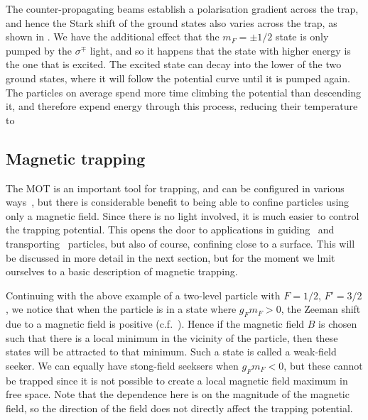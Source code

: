 The counter-propagating beams establish a polarisation gradient across the
trap, and hence the Stark shift of the ground states also varies across the
trap, as shown in \myfigref{}. We have the additional effect that the
$m_F=\pm1/2$ state is only pumped by the $\sigma^\mp$ light, and so it happens
that the state with higher energy is the one that is excited. The excited state
can decay into the lower of the two ground states, where it will follow the
potential curve until it is pumped again. The particles on average spend more
time climbing the potential than descending it, and therefore expend energy
through this process, reducing their temperature to 



\subsection{Magnetic trapping}

The MOT is an important tool for trapping, and can be configured in various
ways~\cite{}, but there is considerable benefit to being able to confine
particles using only a magnetic field. Since there is no light involved, it is
much easier to control the trapping potential. This opens the door to
applications in guiding~\cite{} and transporting~\cite{} particles, but also of
course, confining close to a surface. This will be discussed in more detail in
the next section, but for the moment we lmit ourselves to a basic description
of magnetic trapping.

Continuing with the above example of a two-level particle with $F=1/2$,
$F'=3/2$, we notice that when the particle is in a state where $g_F m_F > 0$,
the Zeeman shift due to a magnetic field is positive (c.f.\
). Hence if the magnetic field $B$ is chosen such
that there is a local minimum in the vicinity of the particle, then these
states will be attracted to that minimum. Such a state is called a weak-field
seeker. We can equally have stong-field seeksers when $g_F m_F < 0$, but these
cannot be trapped since it is not possible to create a local magnetic field
maximum in free space.
%
Note that the dependence here is on the magnitude of the magnetic field, so the
direction of the field does not directly affect the trapping potential.

